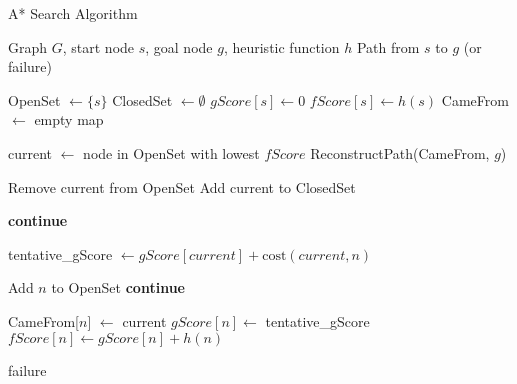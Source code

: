 \begin{algorithm}
\caption{A* Search Algorithm}
\label{alg:astar}
\begin{algorithmic}
    \REQUIRE Graph $G$, start node $s$, goal node $g$, heuristic function $h$
    \ENSURE Path from $s$ to $g$ (or failure)
    
    \STATE OpenSet $\gets \{s\}$
    \STATE ClosedSet $\gets \emptyset$
    \STATE $gScore[s] \gets 0$
    \STATE $fScore[s] \gets h(s)$
    \STATE CameFrom $\gets$ empty map
    
        \STATE current $\gets$ node in OpenSet with lowest $fScore$
            \RETURN ReconstructPath(CameFrom, $g$)
        \ENDIF
        
        \STATE Remove current from OpenSet
        \STATE Add current to ClosedSet
        
                \STATE \textbf{continue}
            \ENDIF
            
            \STATE tentative\_gScore $\gets gScore[current] + \text{cost}(current, n)$
            
                \STATE Add $n$ to OpenSet
                \STATE \textbf{continue}
            \ENDIF
            
            \STATE CameFrom[$n$] $\gets$ current
            \STATE $gScore[n] \gets$ tentative\_gScore
            \STATE $fScore[n] \gets gScore[n] + h(n)$
        \ENDFOR
    \ENDWHILE

    \RETURN failure

\end{algorithmic}
\end{algorithm}